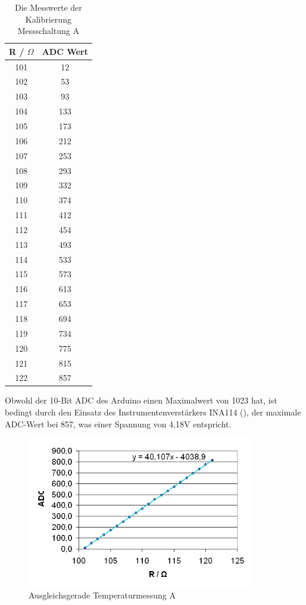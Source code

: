 \documentclass[a4paper,bibtotoc,oneside]{scrbook}
\begin{document}
\begin{table}[htbp]
\centering
\begin{tabular}{ | c | c | }\hline
{\bf R / $\Omega$ } & {\bf ADC Wert}\\ \hline
\hline
101 & 12\\ \hline
102 & 53\\ \hline
103 & 93\\ \hline
104 & 133\\ \hline
105 & 173\\ \hline
106 & 212\\ \hline
107 & 253\\ \hline
108 & 293\\ \hline
109 & 332\\ \hline
110 & 374\\ \hline
111 & 412\\ \hline
112 & 454\\ \hline
113 & 493\\ \hline
114 & 533\\ \hline
115 & 573\\ \hline
116 & 613\\ \hline
117 & 653\\ \hline
118 & 694\\ \hline
119 & 734\\ \hline
120 & 775\\ \hline
121 & 815\\ \hline
122 & 857\\ \hline
\end{tabular}
\caption{Die Messwerte der Kalibrierung Messschaltung A}\label{TabA}
\end{table}

Obwohl der 10-Bit ADC des Arduino einen Maximalwert von 1023 hat, ist bedingt durch den Einsatz des Instrumentenverstärkers INA114 (\cite{ina114}), der maximale ADC-Wert bei 857, was einer Spannung von 4,18V entspricht.  


\begin{figure}[htbp]
\centering
\includegraphics[width=100mm]{img/messa.png}
\caption{Ausgleichsgerade Temperaturmessung A}\label{messa}
\end{figure}
\end{document}
